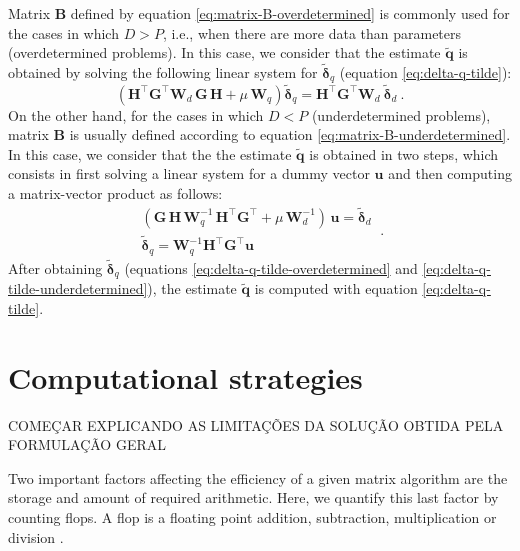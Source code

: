 Matrix $\mathbf{B}$ defined by equation \ref{eq:matrix-B-overdetermined} is commonly used for the cases in which $D > P$, i.e., when
there are more data than parameters (overdetermined problems).
In this case, we consider that the estimate $\tilde{\mathbf{q}}$ is obtained by solving the following linear system
for $\tilde{\boldsymbol{\delta}}_{q}$ (equation \ref{eq:delta-q-tilde}):
\begin{equation}
	\left( \mathbf{H}^{\top} \mathbf{G}^{\top} \mathbf{W}_{d} \, \mathbf{G} \, \mathbf{H} + 
	\mu \, \mathbf{W}_{q} \right) 
	\tilde{\boldsymbol{\delta}}_{q} = 
	\mathbf{H}^{\top} \mathbf{G}^{\top} \mathbf{W}_{d} \: 
	\tilde{\boldsymbol{\delta}}_{d} \: .
	\label{eq:delta-q-tilde-overdetermined}
\end{equation}
On the other hand, for the cases in which $D < P$ (underdetermined problems), matrix $\mathbf{B}$ is 
usually defined according to equation \ref{eq:matrix-B-underdetermined}. In this case, we consider that the 
the estimate $\tilde{\mathbf{q}}$ is obtained in two steps, which consists in first solving a linear system 
for a dummy vector $\mathbf{u}$ and then computing a matrix-vector product as follows:
\begin{equation}
	\begin{split}
		\left( \mathbf{G} \, \mathbf{H} \, \mathbf{W}_{q}^{-1} \,
		\mathbf{H}^{\top}\mathbf{G}^{\top} + \mu \, \mathbf{W}_{d}^{-1} \right) \,  
		\mathbf{u} = \tilde{\boldsymbol{\delta}}_{d} \\
		\tilde{\boldsymbol{\delta}}_{q} = \mathbf{W}_{q}^{-1}
		\mathbf{H}^{\top} \mathbf{G}^{\top} \mathbf{u}
	\end{split} \: .
	\label{eq:delta-q-tilde-underdetermined}
\end{equation}
After obtaining $\tilde{\boldsymbol{\delta}}_{q}$ (equations \ref{eq:delta-q-tilde-overdetermined} and \ref{eq:delta-q-tilde-underdetermined}),
the estimate $\tilde{\mathbf{q}}$ is computed with equation \ref{eq:delta-q-tilde}.

\section{Computational strategies}

COMEÇAR EXPLICANDO AS LIMITAÇÕES DA SOLUÇÃO OBTIDA PELA FORMULAÇÃO GERAL

Two important factors affecting the efficiency of a given matrix algorithm are the 
storage and amount of required arithmetic. Here, we quantify this last factor by counting flops.
A flop is a floating point addition, subtraction, multiplication or division \cite[][ p. 12--14]{golub-vanloan2013}.

